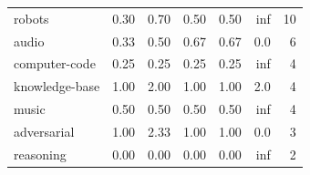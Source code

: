 \documentclass[11pt]{report}
\begin{document}
\begin{center}
\begin{tabular}{p{1cm}rrrrrr}
robots                      &     0.30 &         0.70 &          0.50 &              0.50 &                    inf &    10 \\
audio                       &     0.33 &         0.50 &          0.67 &              0.67 &                    0.0 &     6 \\
computer-code               &     0.25 &         0.25 &          0.25 &              0.25 &                    inf &     4 \\
knowledge-base              &     1.00 &         2.00 &          1.00 &              1.00 &                    2.0 &     4 \\
music                       &     0.50 &         0.50 &          0.50 &              0.50 &                    inf &     4 \\
adversarial                 &     1.00 &         2.33 &          1.00 &              1.00 &                    0.0 &     3 \\
reasoning                   &     0.00 &         0.00 &          0.00 &              0.00 &                    inf &     2 \\
\bottomrule
\end{tabular}
\end{center}

\nocite{*}


\end{document}

